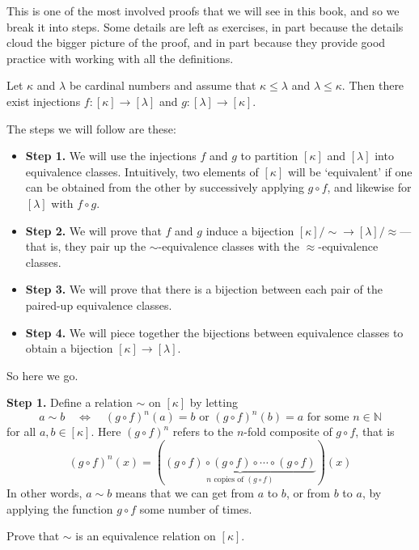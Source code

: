 \begin{cproof}
This is one of the most involved proofs that we will see in this book, and so we break it into steps. Some details are left as exercises, in part because the details cloud the bigger picture of the proof, and in part because they provide good practice with working with all the definitions.

Let $\kappa$ and $\lambda$ be cardinal numbers and assume that $\kappa \le \lambda$ and $\lambda \le \kappa$. Then there exist injections $f : [\kappa] \to [\lambda]$ and $g : [\lambda] \to [\kappa]$.

The steps we will follow are these:
\begin{itemize}
\item \textbf{Step 1.} We will use the injections $f$ and $g$ to partition $[\kappa]$ and $[\lambda]$ into equivalence classes. Intuitively, two elements of $[\kappa]$ will be `equivalent' if one can be obtained from the other by successively applying $g \circ f$, and likewise for $[\lambda]$ with $f \circ g$.
\item \textbf{Step 2.} We will prove that $f$ and $g$ induce a bijection $[\kappa]/{\sim} \to [\lambda]/{\approx}$---that is, they pair up the $\sim$-equivalence classes with the $\approx$-equivalence classes.
\item \textbf{Step 3.} We will prove that there is a bijection between each pair of the paired-up equivalence classes.
\item \textbf{Step 4.} We will piece together the bijections between equivalence classes to obtain a bijection $[\kappa] \to [\lambda]$.
\end{itemize}

So here we go.

\textbf{Step 1.} Define a relation $\sim$ on $[\kappa]$ by letting
\[ a \sim b \quad \Leftrightarrow \quad (g \circ f)^n(a) = b \text{ or } (g \circ f)^n(b) = a \text{ for some } n \in \mathbb{N} \]
for all $a,b \in [\kappa]$. Here $(g \circ f)^n$ refers to the $n$-fold composite of $g \circ f$, that is
\[ (g \circ f)^n(x) = (\underbrace{(g \circ f) \circ (g \circ f) \circ \cdots \circ (g \circ f)}_{\text{$n$ copies of $(g \circ f)$}}) (x) \]
In other words, $a \sim b$ means that we can get from $a$ to $b$, or from $b$ to $a$, by applying the function $g \circ f$ some number of times.

\begin{exercise}
Prove that $\sim$ is an equivalence relation on $[\kappa]$.
\end{exercise}


\end{cproof}
